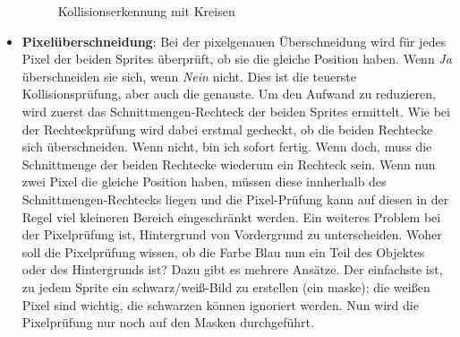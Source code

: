 \begin{itemize}
\begin{figure}[H]
\begin{center}
\caption{Kollisionserkennung mit Kreisen}\label{picKollKreis01}
\end{center}
\end{figure}

    \item \textbf{Pixelüberschneidung}: Bei der pixelgenauen Überschneidung wird für jedes Pixel der beiden Sprites überprüft, ob sie die gleiche Position haben. Wenn \emph{Ja} überschneiden sie sich, wenn \emph{Nein} nicht. Dies ist die teuerste Kollisionsprüfung, aber auch die genauste. Um den Aufwand zu reduzieren, wird zuerst das Schnittmengen-Rechteck der beiden Sprites ermittelt. Wie bei der Rechteckprüfung wird dabei erstmal gecheckt, ob die beiden Rechtecke sich überschneiden. Wenn nicht, bin ich sofort fertig. Wenn doch, muss die Schnittmenge der beiden Rechtecke wiederum ein Rechteck sein. Wenn nun zwei Pixel die gleiche Position haben, müssen diese innherhalb des Schnittmengen-Rechtecks liegen und die Pixel-Prüfung kann auf diesen in der Regel viel kleineren Bereich eingeschränkt werden. Ein weiteres Problem bei der Pixelprüfung ist, Hintergrund von Vordergrund zu unterscheiden. Woher soll die Pixelprüfung wissen, ob die Farbe Blau nun ein Teil des Objektes oder des Hintergrunds ist? Dazu gibt es mehrere Ansätze. Der einfachste ist, zu jedem Sprite ein schwarz/weiß-Bild zu erstellen (ein \gls{maske}); die weißen Pixel sind wichtig, die schwarzen können ignoriert werden. Nun wird die Pixelprüfung nur noch auf den Masken durchgeführt.

\end{itemize}

